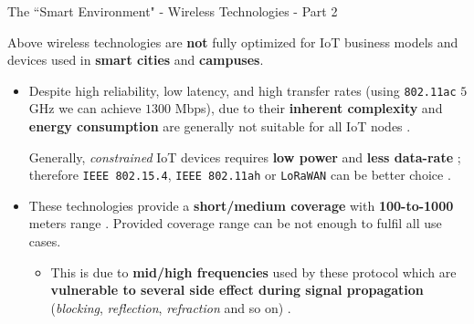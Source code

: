 \documentclass[10pt]{beamer}
\begin{document}
\begin{frame}{The ``Smart Environment" - Wireless Technologies - Part 2}

\begin{block}{}
\justifying
Above wireless technologies are \textbf{not} fully optimized for IoT business models and devices used in \textbf{smart cities} and \textbf{campuses}.
\end{block}

\begin{itemize}
\justifying
\item Despite high reliability, low latency, and high transfer rates (using \texttt{802.11ac} $5$ GHz we can achieve $1300$ Mbps), due to their \textbf{inherent complexity} and \textbf{energy consumption} are generally not suitable for all IoT nodes \cite{IOTCITY}.

Generally, \textit{constrained} IoT devices requires \textbf{low power} and \textbf{less data-rate} \cite{nokia}; therefore  \texttt{IEEE 802.15.4}, \texttt{IEEE 802.11ah} or \texttt{LoRaWAN} can be better choice \cite{IOTCITY}.

\item These technologies provide a \textbf{short/medium coverage} with \textbf{100-to-1000} meters range \cite{LoRaWAN}. Provided coverage range can be not enough to fulfil all use cases.

\begin{itemize}

\item This is due to \textbf{mid/high frequencies} used by these protocol which are \textbf{vulnerable to several side effect during signal propagation} (\textit{blocking}, \textit{reflection}, \textit{refraction} and so on) \cite{schiller2003mobile}.
\end{itemize}

\end{itemize}



\end{frame} 
\end{document}
